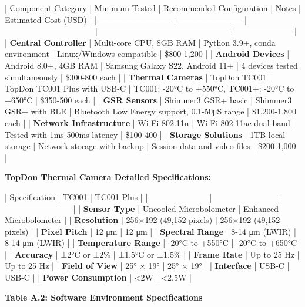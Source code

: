 \documentclass[11pt,a4paper]{article}
\begin{document}
| Component Category         | Minimum Tested          | Recommended Configuration       | Notes                                           | Estimated Cost (USD) |
|----------------------------|-------------------------|---------------------------------|-------------------------------------------------|----------------------|
| \textbf{Central Controller}     | Multi-core CPU, 8GB RAM | Python 3.9+, conda environment  | Linux/Windows compatible                        | \$800-1,200           |
| \textbf{Android Devices}        | Android 8.0+, 4GB RAM   | Samsung Galaxy S22, Android 11+ | 4 devices tested simultaneously                 | \$300-800 each        |
| \textbf{Thermal Cameras}        | TopDon TC001            | TopDon TC001 Plus with USB-C    | TC001: -20°C to +550°C, TC001+: -20°C to +650°C | \$350-500 each        |
| \textbf{GSR Sensors}            | Shimmer3 GSR+ basic     | Shimmer3 GSR+ with BLE          | Bluetooth Low Energy support, 0.1-50μS range    | \$1,200-1,800 each    |
| \textbf{Network Infrastructure} | Wi-Fi 802.11n           | Wi-Fi 802.11ac dual-band        | Tested with 1ms-500ms latency                   | \$100-400             |
| \textbf{Storage Solutions}      | 1TB local storage       | Network storage with backup     | Session data and video files                    | \$200-1,000           |

\textbf{TopDon Thermal Camera Detailed Specifications:}

| Specification         | TC001                   | TC001 Plus              |
|-----------------------|-------------------------|-------------------------|
| \textbf{Sensor Type}       | Uncooled Microbolometer | Enhanced Microbolometer |
| \textbf{Resolution}        | 256×192 (49,152 pixels) | 256×192 (49,152 pixels) |
| \textbf{Pixel Pitch}       | 12 μm                   | 12 μm                   |
| \textbf{Spectral Range}    | 8-14 μm (LWIR)          | 8-14 μm (LWIR)          |
| \textbf{Temperature Range} | -20°C to +550°C         | -20°C to +650°C         |
| \textbf{Accuracy}          | ±2°C or ±2\%             | ±1.5°C or ±1.5\%         |
| \textbf{Frame Rate}        | Up to 25 Hz             | Up to 25 Hz             |
| \textbf{Field of View}     | 25° × 19°               | 25° × 19°               |
| \textbf{Interface}         | USB-C                   | USB-C                   |
| \textbf{Power Consumption} | <2W                     | <2.5W                   |

\textbf{Table A.2: Software Environment Specifications}
\end{document}
